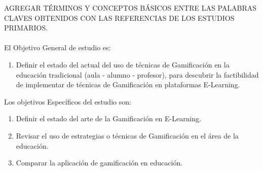 \documentclass[fleqn,10pt]{SelfArx} %
\begin{document}
AGREGAR TÉRMINOS Y CONCEPTOS BÁSICOS ENTRE LAS PALABRAS CLAVES OBTENIDOS CON LAS REFERENCIAS DE LOS ESTUDIOS PRIMARIOS.\\ \\


El Objetivo General de estudio es:
\begin{enumerate}
	\item Definir el estado del actual del uso de técnicas de Gamificación en la educación tradicional (aula - alumno - profesor), para descubrir la factibilidad de implementar de técnicas de Gamificación en plataformas E-Learning.
\end{enumerate}
Los objetivos Específicos del estudio son:
\begin{enumerate}
	\item Definir el estado del arte de la Gamificación en E-Learning.
	\item Revisar el uso de estrategias o técnicas de Gamificación en el área de la educación.
	\item Comparar la aplicación de gamificación en educación.
\end{enumerate}

\end{document}

